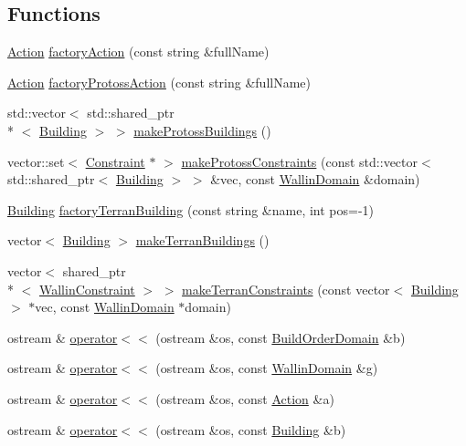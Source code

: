 \subsection*{Functions}
\begin{DoxyCompactItemize}
\item 
\hyperlink{classghost_1_1Action}{Action} \hyperlink{namespaceghost_a2f66838c6ce8dec9c2c69ee4668df38b}{factory\-Action} (const string \&full\-Name)
\item 
\hyperlink{classghost_1_1Action}{Action} \hyperlink{namespaceghost_a2b18a866dd0083eab934fa1263f11ecf}{factory\-Protoss\-Action} (const string \&full\-Name)
\item 
std\-::vector$<$ std\-::shared\-\_\-ptr\\*
$<$ \hyperlink{classghost_1_1Building}{Building} $>$ $>$ \hyperlink{namespaceghost_af3e32bb59f07ee561580978affe544bd}{make\-Protoss\-Buildings} ()
\item 
vector\-::set$<$ \hyperlink{classghost_1_1Constraint}{Constraint} $\ast$ $>$ \hyperlink{namespaceghost_a876b814af945577733c112c82d0423c3}{make\-Protoss\-Constraints} (const std\-::vector$<$ std\-::shared\-\_\-ptr$<$ \hyperlink{classghost_1_1Building}{Building} $>$ $>$ \&vec, const \hyperlink{classghost_1_1WallinDomain}{Wallin\-Domain} \&domain)
\item 
\hyperlink{classghost_1_1Building}{Building} \hyperlink{namespaceghost_a797dd3167189ccc913156ff624a7ad6a}{factory\-Terran\-Building} (const string \&name, int pos=-\/1)
\item 
vector$<$ \hyperlink{classghost_1_1Building}{Building} $>$ \hyperlink{namespaceghost_ade7cf14b6b46de3b038be9fb6c8afd82}{make\-Terran\-Buildings} ()
\item 
vector$<$ shared\-\_\-ptr\\*
$<$ \hyperlink{classghost_1_1WallinConstraint}{Wallin\-Constraint} $>$ $>$ \hyperlink{namespaceghost_af7fa3891f5f6563a142a99d3ab6b604b}{make\-Terran\-Constraints} (const vector$<$ \hyperlink{classghost_1_1Building}{Building} $>$ $\ast$vec, const \hyperlink{classghost_1_1WallinDomain}{Wallin\-Domain} $\ast$domain)
\item 
ostream \& \hyperlink{namespaceghost_ab9c6639581eec36ee5c981bdcebaa4d1}{operator$<$$<$} (ostream \&os, const \hyperlink{classghost_1_1BuildOrderDomain}{Build\-Order\-Domain} \&b)
\item 
ostream \& \hyperlink{namespaceghost_a324a8e116f71d2eee57a356671330cc1}{operator$<$$<$} (ostream \&os, const \hyperlink{classghost_1_1WallinDomain}{Wallin\-Domain} \&g)
\item 
ostream \& \hyperlink{namespaceghost_a8126241ce5aea5db6c61184fa000a90f}{operator$<$$<$} (ostream \&os, const \hyperlink{classghost_1_1Action}{Action} \&a)
\item 
ostream \& \hyperlink{namespaceghost_a1e7e02c276d52eda961d841a47211933}{operator$<$$<$} (ostream \&os, const \hyperlink{classghost_1_1Building}{Building} \&b)
\end{DoxyCompactItemize}
